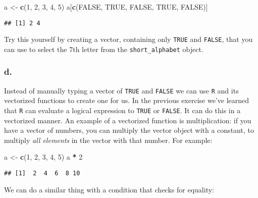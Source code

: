 \documentclass[]{article}
\newenvironment{Shaded}{\begin{snugshade}}{\end{snugshade}}
\newcommand{\DecValTok}[1]{\textcolor[rgb]{0.00,0.00,0.81}{#1}}
\newcommand{\KeywordTok}[1]{\textcolor[rgb]{0.13,0.29,0.53}{\textbf{#1}}}
\newcommand{\NormalTok}[1]{#1}
\newcommand{\OperatorTok}[1]{\textcolor[rgb]{0.81,0.36,0.00}{\textbf{#1}}}
\newcommand{\OtherTok}[1]{\textcolor[rgb]{0.56,0.35,0.01}{#1}}
\newcommand{\StringTok}[1]{\textcolor[rgb]{0.31,0.60,0.02}{#1}}
\begin{document}
\begin{Shaded}
\begin{Highlighting}[]
\NormalTok{a <-}\StringTok{ }\KeywordTok{c}\NormalTok{(}\DecValTok{1}\NormalTok{, }\DecValTok{2}\NormalTok{, }\DecValTok{3}\NormalTok{, }\DecValTok{4}\NormalTok{, }\DecValTok{5}\NormalTok{)}
\NormalTok{a[}\KeywordTok{c}\NormalTok{(}\OtherTok{FALSE}\NormalTok{, }\OtherTok{TRUE}\NormalTok{, }\OtherTok{FALSE}\NormalTok{, }\OtherTok{TRUE}\NormalTok{, }\OtherTok{FALSE}\NormalTok{)]}
\end{Highlighting}
\end{Shaded}

\begin{verbatim}
## [1] 2 4
\end{verbatim}

Try this yourself by creating a vector, containing only \texttt{TRUE}
and \texttt{FALSE}, that you can use to select the 7th letter from the
\texttt{short\_alphabet} object.

\hypertarget{d.-4}{%
\subsubsection{d.}\label{d.-4}}

Instead of manually typing a vector of \texttt{TRUE} and \texttt{FALSE}
we can use \texttt{R} and its vectorized functions to create one for us.
In the previous exercise we've learned that \texttt{R} can evaluate a
logical expression to \texttt{TRUE} or \texttt{FALSE}. It can do this in
a vectorized manner. An example of a vectorized function is
multiplication: if you have a vector of numbers, you can multiply the
vector object with a constant, to multiply \emph{all elements} in the
vector with that number. For example:

\begin{Shaded}
\begin{Highlighting}[]
\NormalTok{a <-}\StringTok{ }\KeywordTok{c}\NormalTok{(}\DecValTok{1}\NormalTok{, }\DecValTok{2}\NormalTok{, }\DecValTok{3}\NormalTok{, }\DecValTok{4}\NormalTok{, }\DecValTok{5}\NormalTok{)}
\NormalTok{a }\OperatorTok{*}\StringTok{ }\DecValTok{2}
\end{Highlighting}
\end{Shaded}

\begin{verbatim}
## [1]  2  4  6  8 10
\end{verbatim}

We can do a similar thing with a condition that checks for equality:
\end{document}
